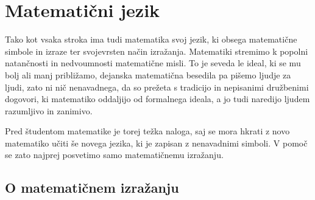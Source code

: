 \chapter{Matematični jezik}
\label{cha:matematicni-jezik}

Tako kot vsaka stroka ima tudi matematika svoj jezik, ki obsega matematične simbole in
izraze ter svojevrsten način izražanja. Matematiki stremimo k popolni natančnosti in
nedvoumnosti matematične misli. To je seveda le ideal, ki se mu bolj ali manj približamo,
dejanska matematična besedila pa pišemo ljudje za ljudi, zato ni nič nenavadnega, da so
prežeta s tradicijo in nepisanimi družbenimi dogovori, ki matematiko oddaljijo od
formalnega ideala, a jo tudi naredijo ljudem razumljivo in zanimivo.

Pred študentom matematike je torej težka naloga, saj se mora hkrati z novo matematiko
učiti še novega jezika, ki je zapisan z nenavadnimi simboli. V pomoč se zato najprej
posvetimo samo matematičnemu izražanju.

\section{O matematičnem izražanju}
\label{sec:o-matematicnem-izrazanju}

% 
% 
% 
% 

